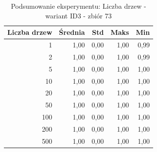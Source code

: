 \begin{table}[htbp]
\centering
\small
\setlength{\tabcolsep}{6pt}
\renewcommand{\arraystretch}{1.2}
\caption{Podsumowanie eksperymentu: Liczba drzew - wariant ID3 - zbiór 73}
\label{tab:ID3_tree_count_73}
\begin{tabular}{r|r|r|r|r}
\toprule
Liczba drzew & Średnia & Std & Maks & Min \\
\hline
1 & 1,00 & 0,00 & 1,00 & 0,99 \\
2 & 1,00 & 0,00 & 1,00 & 0,99 \\
5 & 1,00 & 0,00 & 1,00 & 1,00 \\
10 & 1,00 & 0,00 & 1,00 & 1,00 \\
20 & 1,00 & 0,00 & 1,00 & 1,00 \\
50 & 1,00 & 0,00 & 1,00 & 1,00 \\
100 & 1,00 & 0,00 & 1,00 & 1,00 \\
200 & 1,00 & 0,00 & 1,00 & 1,00 \\
500 & 1,00 & 0,00 & 1,00 & 1,00 \\
\bottomrule
\end{tabular}
\end{table}